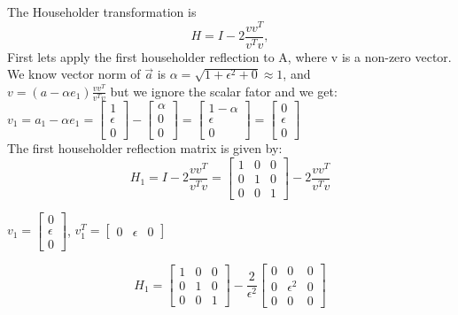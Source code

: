 \documentclass[12pt, oneside]{article}   	%
\begin{document}
\begin{enumerate}
\begin{enumerate}
		The Householder transformation is $$H=I - 2\frac{vv^T}{v^Tv},$$
		First lets apply the first householder reflection to A, where v is a non-zero vector. We know vector norm of $\vec{a}$ is $\alpha=\sqrt{1+\epsilon^2+0} \approx1$, and \\$v= (a- \alpha e_1)\frac{vv^T}{v^Tv}$ but we ignore the scalar fator and we get:\\
		$v_1= a_1- \alpha e_1=\left [\begin{array}{c} 1\\\epsilon\\
		0\end{array}\right]- \left [\begin{array}{c} \alpha\\0\\
		0\end{array}\right]= \left [\begin{array}{c}1- \alpha\\\epsilon\\
		0\end{array}\right]=\left [\begin{array}{c} 0\\\epsilon\\
		0\end{array}\right]$\\
		
		The first householder reflection matrix is given by:
		$$H_1=I - 2\frac{vv^T}{v^Tv}= \left [\begin{array}{ccc} 1&0&0\\0&1&0\\0&0&1\end{array}\right]-2\frac{vv^T}{v^Tv}$$
		
		$v_1=\left [\begin{array}{c} 0\\\epsilon\\
			0\end{array}\right]$, $v_1^T=\left [\begin{array}{ccc} 0&\epsilon&0\end{array}\right]$
			
		$$H_1=\left [\begin{array}{ccc} 1&0&0\\0&1&0\\0&0&1\end{array}\right]- \frac{2}{\epsilon^2}\left [\begin{array}{ccc} 0&0&0\\0&\epsilon^2&0\\0&0&0\end{array}\right]$$
			

\end{enumerate}
\end{enumerate}
\end{document}
